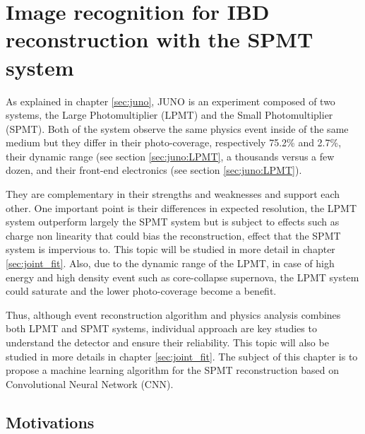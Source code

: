 \chapter{Image recognition for IBD reconstruction with the SPMT system}
\label{sec:jcnn}

As explained in chapter \ref{sec:juno}, JUNO is an experiment composed of two systems, the Large Photomultiplier (LPMT) and the Small Photomultiplier (SPMT). Both of the system observe the same physics event inside of the same medium but they differ in their photo-coverage, respectively 75.2\% and 2.7\%, their dynamic range (see section \ref{sec:juno:LPMT}, a thousands versus a few dozen, and their front-end electronics (see section \ref{sec:juno:LPMT}).

They are complementary in their strengths and weaknesses and support each other. One important point is their differences in expected resolution, the LPMT system outperform largely the SPMT system but is subject to effects such as charge  non linearity \cite{juno_collaboration_calibration_2021} that could bias the reconstruction, effect that the SPMT system is impervious to. This topic will be studied in more detail in chapter \ref{sec:joint_fit}. Also, due to the dynamic range of the LPMT, in case of high energy and high density event such as core-collapse supernova, the LPMT system could saturate and the lower photo-coverage become a benefit.

Thus, although event reconstruction algorithm and physics analysis combines both LPMT and SPMT systems, individual approach are key studies to understand the detector and ensure their reliability. This topic will also be studied in more details in chapter \ref{sec:joint_fit}. The subject of this chapter is to propose a machine learning algorithm for the SPMT reconstruction based on Convolutional Neural Network (CNN).

\section{Motivations}


